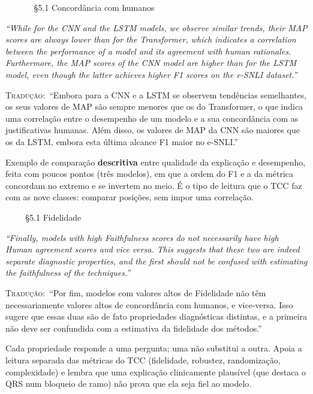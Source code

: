 \documentclass[11pt,a4paper]{article}
\newcommand{\pagechip}[1]{{\setlength{\fboxsep}{1.5pt}\colorbox{cAcc}{\textcolor{white}{\scriptsize\texttt{#1}}}}}
\newenvironment{origquote}{\par\itshape\small}{\par}
\newenvironment{tradquote}{\par\small\textsc{Tradução:}\ }{\par}
\newcommand{\explab}[1]{\par\smallskip{\small\color{cAcc}\textbf{\MakeUppercase{#1}}}\par}
\begin{document}
\begin{citacard}{\pagechip{p. 7--9} §5.1 Concordância com humanos}
\begin{origquote}“While for the CNN and the LSTM models, we observe similar trends, their MAP scores are always lower than for the Transformer, which indicates a correlation between the performance of a model and its agreement with human rationales. Furthermore, the MAP scores of the CNN model are higher than for the LSTM model, even though the latter achieves higher F1 scores on the e-SNLI dataset.”\end{origquote}
\begin{tradquote}“Embora para a CNN e a LSTM se observem tendências semelhantes, os seus valores de MAP são sempre menores que os do Transformer, o que indica uma correlação entre o desempenho de um modelo e a sua concordância com as justificativas humanas. Além disso, os valores de MAP da CNN são maiores que os da LSTM, embora esta última alcance F1 maior no e-SNLI.”\end{tradquote}
\explab{Explicação}
Exemplo de comparação \textbf{descritiva} entre qualidade da explicação e desempenho, feita com poucos pontos (três modelos), em que a ordem do F1 e a da métrica concordam no extremo e se invertem no meio. É o tipo de leitura que o TCC faz com as nove classes: comparar posições, sem impor uma correlação.
\end{citacard}

\begin{citacard}{\pagechip{p. 9} §5.1 Fidelidade}
\begin{origquote}“Finally, models with high Faithfulness scores do not necessarily have high Human agreement scores and vice versa. This suggests that these two are indeed separate diagnostic properties, and the first should not be confused with estimating the faithfulness of the techniques.”\end{origquote}
\begin{tradquote}“Por fim, modelos com valores altos de Fidelidade não têm necessariamente valores altos de concordância com humanos, e vice-versa. Isso sugere que essas duas são de fato propriedades diagnósticas distintas, e a primeira não deve ser confundida com a estimativa da fidelidade dos métodos.”\end{tradquote}
\explab{Explicação}
Cada propriedade responde a uma pergunta; uma não substitui a outra. Apoia a leitura separada das métricas do TCC (fidelidade, robustez, randomização, complexidade) e lembra que uma explicação clinicamente plausível (que destaca o QRS num bloqueio de ramo) não prova que ela seja fiel ao modelo.
\end{citacard}
\end{document}
